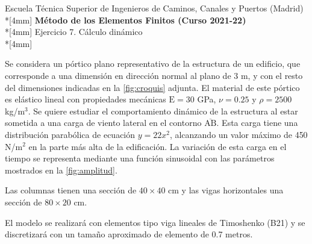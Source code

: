 \documentclass[a4paper,12pt]{article}
\begin{document}
\def\bm#1{{\mbox{\boldmath $#1$}}}
\def\eqdef{\buildrel \rm def \over =}
\def\signo{\mathop{\rm signo}\nolimits}

\mbox{}\vspace*{-20mm}

{\centering
{\small\sc Escuela Técnica Superior de Ingenieros de Caminos, Canales y Puertos (Madrid)}\\*[4mm]
{\Large\bf Método de los Elementos Finitos (Curso 2021-22)}\\*[4mm]
Ejercicio 7. Cálculo dinámico \\*[4mm]
}


\noindent
Se considera un pórtico plano representativo de la estructura de un edificio, que corresponde a una dimensión en dirección normal al plano de 3 m, y con el resto del dimensiones indicadas en la \cref{fig:croquis} adjunta. El material de este pórtico es elástico lineal con propiedades mecánicas $\text{E}=30$ GPa, $\nu=0.25$ y $\rho=2500$ kg/m$^3$. Se quiere estudiar el comportamiento dinámico de la estructura al estar sometida a una carga de viento lateral en el contorno $\overline{\text{AB}}$. Esta carga tiene una distribución parabólica de ecuación $y=22x^2$, alcanzando un valor máximo de 450 N/m$^2$ en la parte más alta de la edificación. La variación de esta carga en el tiempo se representa mediante una función sinusoidal con las parámetros mostrados en la \cref{fig:amplitud}.

Las columnas tienen una sección de $40 \times 40$ cm y las vigas horizontales una sección de $80 \times 20$ cm.

El modelo se realizará con elementos tipo viga lineales de Timoshenko (B21) y se discretizará con un tamaño aproximado de elemento de 0.7 metros. 
\vspace{5mm}
\end{document}
